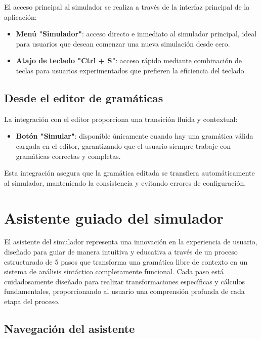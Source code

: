 El acceso principal al simulador se realiza a través de la interfaz principal de la aplicación:

\begin{itemize}
    \item \textbf{Menú \string"Simulador\string"}: acceso directo e inmediato al simulador principal, ideal para usuarios que desean comenzar una nueva simulación desde cero.
    \item \textbf{Atajo de teclado \string"Ctrl + S\string"}: acceso rápido mediante combinación de teclas para usuarios experimentados que prefieren la eficiencia del teclado.
\end{itemize}

\subsection{Desde el editor de gramáticas}

La integración con el editor proporciona una transición fluida y contextual:

\begin{itemize}
    \item \textbf{Botón \string"Simular\string"}: disponible únicamente cuando hay una gramática válida cargada en el editor, garantizando que el usuario siempre trabaje con gramáticas correctas y completas.
\end{itemize}

Esta integración asegura que la gramática editada se transfiera automáticamente al simulador, manteniendo la consistencia y evitando errores de configuración.

\section{Asistente guiado del simulador}

El asistente del simulador representa una innovación en la experiencia de usuario, diseñado para guiar de manera intuitiva y educativa a través de un proceso estructurado de 5 pasos que transforma una gramática libre de contexto en un sistema de análisis sintáctico completamente funcional. Cada paso está cuidadosamente diseñado para realizar transformaciones específicas y cálculos fundamentales, proporcionando al usuario una comprensión profunda de cada etapa del proceso.

\subsection{Navegación del asistente}

